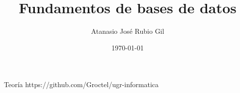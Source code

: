 \documentclass[10pt]{report}
\author{Atanasio José Rubio Gil}
\title{Fundamentos de bases de datos}
\date{\today}
\begin{document}
            {Teoría}
            {https://github.com/Groctel/ugr-informatica}
\tableofcontents

 \pagebreak

\end{document}
